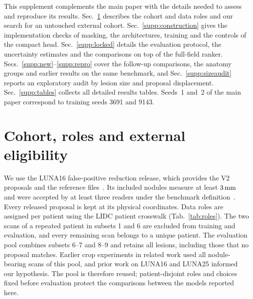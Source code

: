 \clearpage
\setcounter{page}{1}
\maketitlesupplementary
\setcounter{section}{0}
\setcounter{table}{0}
\setcounter{figure}{0}
\setcounter{equation}{0}
\setcounter{algorithm}{0}
\renewcommand{\thesection}{S\arabic{section}}
\renewcommand{\thetable}{S\arabic{table}}
\renewcommand{\thefigure}{S\arabic{figure}}
\renewcommand{\topfraction}{0.95}\renewcommand{\dbltopfraction}{0.95}\renewcommand{\textfraction}{0.05}
\renewcommand{\floatpagefraction}{0.8}\renewcommand{\dblfloatpagefraction}{0.8}
\setcounter{topnumber}{4}\setcounter{dbltopnumber}{4}\setcounter{totalnumber}{6}
\makeatletter
\setlength{\@fptop}{0pt}\setlength{\@fpsep}{14pt}\setlength{\@fpbot}{0pt plus 1fil}
\setlength{\@dblfptop}{0pt}\setlength{\@dblfpsep}{14pt}\setlength{\@dblfpbot}{0pt plus 1fil}
\makeatother

This supplement complements the main paper with the details needed to assess and reproduce its results. Sec.~\ref{supp:roles} describes the cohort and data roles and our search for an untouched external cohort. Sec.~\ref{supp:construction} gives the implementation checks of masking, the architectures, training and the controls of the compact head. Sec.~\ref{supp:locked} details the evaluation protocol, the uncertainty estimates and the comparisons on top of the full-field ranker. Secs.~\ref{supp:new}--\ref{supp:repro} cover the follow-up comparisons, the anatomy groups and earlier results on the same benchmark, and Sec.~\ref{supp:sizeaudit} reports an exploratory audit by lesion size and proposal displacement. Sec.~\ref{supp:tables} collects all detailed results tables. Seeds~1 and~2 of the main paper correspond to training seeds 3691 and 9143.

\section{Cohort, roles and external eligibility}
\label{supp:roles}


We use the LUNA16 false-positive reduction release, which provides the V2 proposals and the reference files~\cite{setio2017luna16}. Its included nodules measure at least $3\,\mathrm{mm}$ and were accepted by at least three readers under the benchmark definition~\cite{setio2017luna16,armato2011lidc}. Every released proposal is kept at its physical coordinates. Data roles are assigned per patient using the LIDC patient crosswalk (Tab.~\ref{tab:roles}). The two scans of a repeated patient in subsets 1 and 6 are excluded from training and evaluation, and every remaining scan belongs to a unique patient. The evaluation pool combines subsets 6--7 and 8--9 and retains all lesions, including those that no proposal matches. Earlier crop experiments in related work used all nodule-bearing scans of this pool, and prior work on LUNA16 and LUNA25 informed our hypothesis. The pool is therefore reused; patient-disjoint roles and choices fixed before evaluation protect the comparisons between the models reported here.

